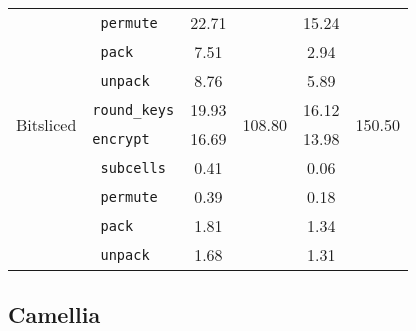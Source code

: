\begin{table}[h!]
\begin{tabular}{llcccc}
                                              & \texttt{ permute} & 22.71 & & 15.24 & \\
                                              & \texttt{ pack} & 7.51 & & 2.94 & \\
                                              & \texttt{ unpack} & 8.76 & & 5.89 & \\
        \midrule
        \multirow{2}{*}{Bitsliced} & \texttt{round\_keys} & 19.93 & \multirow{2}{*}{108.80} & 16.12 & \multirow{2}{*}{150.50} \\
                                   & \texttt{encrypt} & 16.69 & & 13.98 & \\
        \cmidrule(lr){2-2}
                                   & \texttt{ subcells} & 0.41 & & 0.06 & \\
                                   & \texttt{ permute} & 0.39 & & 0.18 & \\
                                   & \texttt{ pack} & 1.81 & & 1.34 & \\
                                   & \texttt{ unpack} & 1.68 & & 1.31 & \\
        \bottomrule
    \end{tabular}
\end{table}

\subsection{Camellia}


